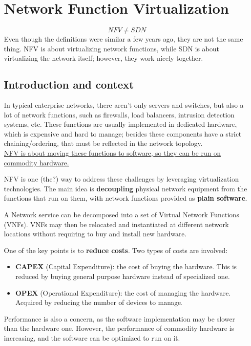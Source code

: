 \chapter{Network Function Virtualization}

\[
  NFV \neq SDN 
\]
Even though the definitions were similar a few years ago, they are not the same thing. NFV is about virtualizing network functions, while SDN is about virtualizing the network itself; however, they work nicely together.

\section{Introduction and context}
In typical enterprise networks, there aren't only servers and switches, but also a lot of network functions, such as firewalls, load balancers, intrusion detection systems, etc. These functions are usually implemented in dedicated hardware, which is expensive and hard to manage; besides these components have a strict chaining/ordering, that must be reflected in the network topology.\\
\ul{NFV is about moving these functions to software, so they can be run on commodity hardware.
}

NFV is one (the?) way to address these
challenges by leveraging virtualization
technologies. 
The main idea is \textbf{decoupling} physical network
equipment from the functions that run on them, with network functions provided as \textbf{plain software}.

A Network service can be decomposed into a set of
Virtual Network Functions (VNFs).
VNFs may then be relocated and instantiated at
different network locations without requiring to buy
and install new hardware.

One of the key points is to \textbf{reduce costs}. Two types of costs are involved:
\begin{itemize}
   \item \textbf{CAPEX} (Capital Expenditure): the cost of buying the hardware.
   This is reduced by buying general purpose hardware instead of specialized one.
   \item \textbf{OPEX} (Operational Expenditure): the cost of managing the hardware.
   Acquired by reducing the number of devices to manage.
\end{itemize}

Performance is also a concern, as the software implementation may be slower than the hardware one. However, the performance of commodity hardware is increasing, and the software can be optimized to run on it.

